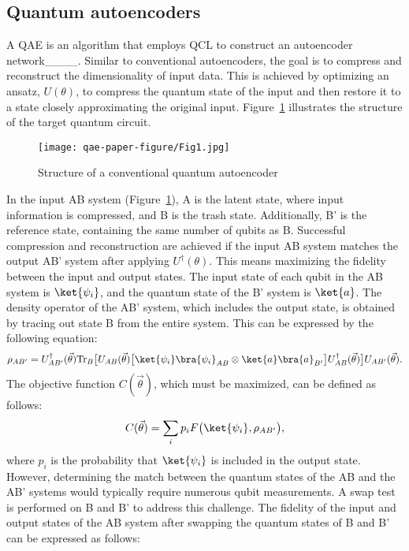 \subsection{Quantum autoencoders}
A QAE is an algorithm that employs QCL to construct an autoencoder network____. Similar to conventional autoencoders, the goal is to compress and reconstruct the dimensionality of input data. This is achieved by optimizing an ansatz, $U(\theta)$, to compress the quantum state of the input and then restore it to a state closely approximating the original input. Figure~\ref{fig:QAE_before_swap} illustrates the structure of the target quantum circuit.
\begin{figure}[t]
\centering
\texttt{[image: qae-paper-figure/Fig1.jpg]}
\caption{Structure of a conventional quantum autoencoder}\label{fig:QAE_before_swap}
\end{figure}
In the input AB system (Figure~\ref{fig:QAE_before_swap}), A is the latent state, where input information is compressed, and B is the trash state. Additionally, B' is the reference state, containing the same number of qubits as B. Successful compression and reconstruction are achieved if the input AB system matches the output AB' system after applying $U^\dagger(\theta)$. This means maximizing the fidelity between the input and output states. The input state of each qubit in the AB system is $\ket{\psi_i}$, and the quantum state of the B' system is $\ket{a}$. The density operator of the AB' system, which includes the output state, is obtained by tracing out state B from the entire system. This can be expressed by the following equation:
\begin{equation}
\rho_{AB'} = U_{AB'}^\dagger(\vec{\theta}) \mathrm{Tr}_B \big[ U_{AB}(\vec{\theta}) \big[ \ket{\psi_i} \bra{\psi_i}_{AB} \otimes \ket{a} \bra{a}_{B'} \big] U_{AB}^\dagger(\vec{\theta}) \big] U_{AB'}(\vec{\theta}). \label{eq:rho_AB'}
\end{equation}
The objective function $C(\vec{\theta})$, which must be maximized, can be defined as follows:
\begin{equation}
C(\vec{\theta}) = \sum_i p_i F \big(\ket{\psi_i}, \rho_{AB'} \big), \label{eq:C1}
\end{equation}
where $p_i$ is the probability that $\ket{\psi_i}$ is included in the output state.
However, determining the match between the quantum states of the AB and the AB' systems would typically require numerous qubit measurements. A swap test is performed on B and B' to address this challenge. The fidelity of the input and output states of the AB system after swapping the quantum states of B and B' can be expressed as follows:
